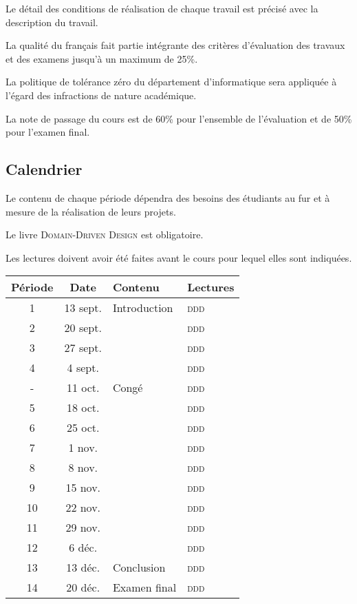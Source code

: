 \documentclass{article}
\begin{document}
Le détail des conditions de réalisation de chaque travail est précisé avec la description du travail. 

La qualité du français fait partie intégrante des critères d'évaluation des travaux et des examens jusqu'à un maximum de 25\%. 

La politique de tolérance zéro du département d'informatique sera appliquée à l'égard des infractions de nature académique. 

La note de passage du cours est de 60\% pour l'ensemble de l'évaluation et de 50\% pour l'examen final.

\subsection{Calendrier}
\label{sub:calendrier}
Le contenu de chaque période dépendra des besoins des étudiants au fur et à mesure de la réalisation de leurs projets.

Le livre \textsc{Domain-Driven Design}\cite{evans2004domain} est obligatoire. 

Les lectures doivent avoir été faites avant le cours pour lequel elles sont indiquées.

\begin{center}
\begin{tabular}{|c|c|l|l|}
\hline
\textbf{Période} & \textbf{Date} & \textbf{Contenu} & \textbf{Lectures} \\
\hline
1 & 13 sept. & Introduction & \textsc{ddd}\cite[ch.1 et 2]{evans2004domain}\\
2 & 20 sept. & & \textsc{ddd}\cite[ch.3]{evans2004domain}\\
3 & 27 sept. & & \textsc{ddd}\cite[ch.4]{evans2004domain}\\
4 & 4 sept. & & \textsc{ddd}\cite[ch.5]{evans2004domain}\\
- & 11 oct. & Congé & \textsc{ddd}\cite[ch.6 et 7]{evans2004domain}\\
5 & 18 oct. & & \textsc{ddd}\cite[ch.8]{evans2004domain}\\
6 & 25 oct. & & \textsc{ddd}\cite[ch.9]{evans2004domain}\\
7 & 1 nov. & & \textsc{ddd}\cite[ch.10]{evans2004domain}\\
8 & 8 nov. & & \textsc{ddd}\cite[ch.11]{evans2004domain}\\
9 & 15 nov. & & \textsc{ddd}\cite[ch.12]{evans2004domain}\\
10 & 22 nov. & & \textsc{ddd}\cite[ch.13]{evans2004domain}\\
11 & 29 nov. & & \textsc{ddd}\cite[ch.14]{evans2004domain}\\
12 & 6 déc. & & \textsc{ddd}\cite[ch.15]{evans2004domain}\\
13 & 13 déc. & Conclusion & \textsc{ddd}\cite[ch.16]{evans2004domain}\\
14 & 20 déc. & Examen final & \textsc{ddd}\cite[ch.17]{evans2004domain}\\
\hline
\end{tabular}
\end{center}
\end{document}
